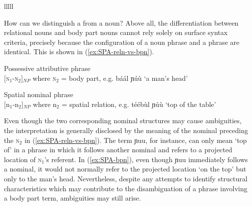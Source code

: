 \begin{exe}
\begin{exe}
\begin{exe}
\begin{exe}
\begin{exe}
\begin{exe}
\begin{exe}
\begin{exe}
\begin{table}
\begin{small}
\begin{Qtabular}{lllll}
 \lspbottomrule
 \end{Qtabular}
\end{small}

\end{table} 





How can we distinguish a  from a noun?  Above all,  the differentiation between relational nouns and body part nouns cannot rely solely on surface syntax criteria, precisely because the configuration of a  noun phrase and a  phrase are identical. This is shown in (\ref{ex:SPA-reln-vs-bpn}). 

 
\ea\label{ex:SPA-reln-vs-bpn}
\ea\label{ex:SPA-bpn}{\rm Possessive attributive phrase}\\
 {\rm {[\textsc{n}$_{1}$-\textsc{n}$_{2}$]}$_{NP}$ where \textsc{n}$_{2}$ = body 
part,   e.g. {\sls báál  ɲúù} {\rm `a man's head'}}

\ex\label{ex:SPA-reln}{\rm Spatial nominal  phrase}\\
 {\rm {[{\sc n}$_{1}$-{\sc n}$_{2}$]}$_{NP}$ where {\sc n}$_{2}$ = spatial relation,   
e.g. {\sls téébùl  ɲúù}  {\rm  `top of the table'}}
\z
\z

Even though the two corresponding nominal structures may cause ambiguities, the interpretation is generally disclosed by the meaning of the nominal preceding the \textsc{n}$_{2}$ in  (\ref{ex:SPA-reln-vs-bpn}). The term  {\sls  ɲuu}, for instance, can only mean `top of' in a phrase in which it follows another nominal and refers to a projected location of \textsc{n}$_{1}$'s referent. In (\ref{ex:SPA-bpn}), even though {\sls ɲuu} immediately follows a nominal,  it would not normally refer to the projected location `on the top' but only to the man's head. Nevertheless, despite any attempts to identify  structural characteristics which may contribute to the disambiguation of a phrase involving a body part term,  ambiguities may still arise.



\end{exe}
\end{exe}
\end{exe}
\end{exe}
\end{exe}
\end{exe}
\end{exe}
\end{exe}
